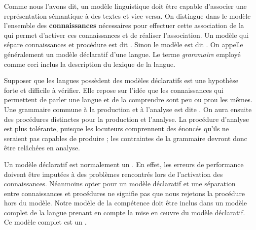 Comme nous l’avons dit, un modèle linguistique doit être capable d’associer une représentation sémantique à des textes et vice versa. On distingue dans le modèle l’ensemble des \textbf{connaissances} nécessaires pour effectuer cette association de la  qui permet d’activer ces connaissances et de réaliser l’association. Un modèle qui sépare connaissances et procédure est dit . Sinon le modèle est dit . On appelle généralement  un modèle déclaratif d’une langue. Le terme \textit{grammaire} employé comme ceci inclus la description du lexique de la langue.

Supposer que les langues possèdent des modèles déclaratifs est une hypothèse forte et difficile à vérifier. Elle repose sur l’idée que les connaissances qui permettent de parler une langue et de la comprendre sont peu ou prou les mêmes. Une grammaire commune à la production et à l’analyse est dite . On aura ensuite des procédures distinctes pour la production et l’analyse. La procédure d’analyse est plus tolérante, puisque les locuteurs comprennent des énoncés qu’ils ne seraient pas capables de produire ; les contraintes de la grammaire devront donc être relâchées en analyse.

Un modèle déclaratif est normalement un . En effet, les erreurs de performance doivent être imputées à des problèmes rencontrés lors de l’activation des connaissances. Néanmoins opter pour un modèle déclaratif et une séparation entre connaissances et procédures ne signifie pas que nous rejetons la procédure hors du modèle. Notre modèle de la compétence doit être inclus dans un modèle complet de la langue prenant en compte la mise en œuvre du modèle déclaratif. Ce modèle complet est un .

